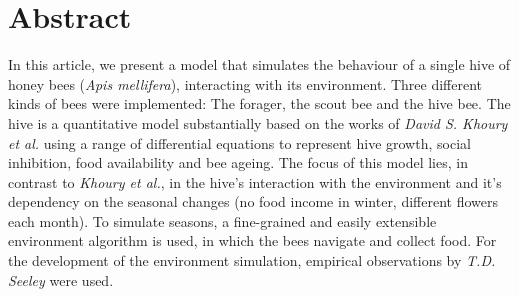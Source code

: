 \section*{Abstract}
In this article, we present a model that simulates the behaviour of a single hive of honey bees (\textit{Apis mellifera}), interacting with its environment. Three different kinds of bees were implemented: The forager, the scout bee and the hive bee. The hive is a quantitative model substantially based on the works of \textit{David S. Khoury et al.} \cite{khoury13} using a range of differential equations to represent hive growth, social inhibition, food availability and bee ageing. The focus of this model lies, in contrast to \textit{Khoury et al.}, in the hive's interaction with the environment and it's dependency on the seasonal changes (no food income in winter, different flowers each month). To simulate seasons, a fine-grained and easily extensible environment algorithm is used, in which the bees navigate and collect food. For the development of the environment simulation, empirical observations by \textit{T.D. Seeley} \cite{seeley95} were used.